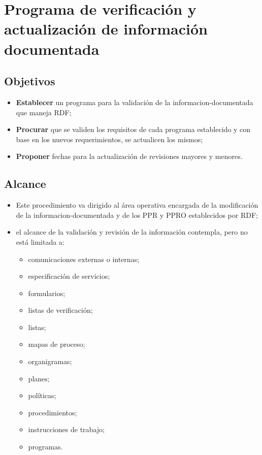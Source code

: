 \thispagestyle{formato-PI}
\renewcommand{\MayorVer}{1}
\renewcommand{\MenorVer}{0}
\renewcommand{\Codigo}{BPD-11-PRO}
\renewcommand{\FechaPub}{2023--01}
\renewcommand{\Titulo}{Programa de verificación y actualización de información documentada}

\section{\Titulo}
\label{informacion.actualizacion}

\subsection{Objetivos}
\begin{itemize}
    \item \textbf{Establecer} un programa para la validación de la \gls{informacion-documentada} que maneja \gls{RDF};
    \item \textbf{Procurar} que se validen los requisitos de cada programa establecido y con base en los nuevos requerimientos, se actualicen los mismos;
    \item \textbf{Proponer} fechas para la actualización de revisiones mayores y menores.
\end{itemize}

\subsection{Alcance}
\begin{itemize}
    \item Este procedimiento va dirigido al área operativa encargada de la modificación de la \gls{informacion-documentada} y de los \gls{PPR} y \gls{PPRO} establecidos por \gls{RDF};
    \item el alcance de la validación y revisión de la información contempla, pero no está limitada a:
          \begin{itemize}
              \item comunicaciones externas o internas;
              \item especificación de servicios;
              \item formularios;
              \item listas de verificación;
              \item listas;
              \item mapas de proceso;
              \item organigramas;
              \item planes;
              \item políticas;
              \item procedimientos;
              \item instrucciones de trabajo;
              \item programas.
          \end{itemize}
\end{itemize}

